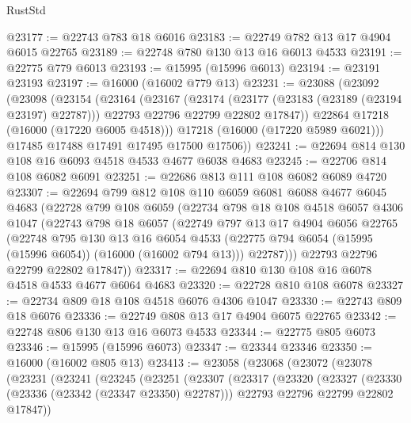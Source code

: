 \begin{lexlean}{RustStd}
\begin{coremodule}
@23177 := @22743 @783 @18 @6016
@23183 := @22749 @782 @13 @17 @4904 @6015 @22765
@23189 := @22748 @780 @130 @13 @16 @6013 @4533
@23191 := @22775 @779 @6013
@23193 := @15995 (@15996 @6013)
@23194 := @23191 @23193
@23197 := @16000 (@16002 @779 @13)
@23231 := @23088
    (@23092
      (@23098
        (@23154
          (@23164
            (@23167
              (@23174
                (@23177 (@23183 (@23189 (@23194 @23197) @22787)))
                @22793
                @22796
                @22799
                @22802
                @17847))
            @22864
            @17218
            (@16000 (@17220 @6005 @4518)))
          @17218
          (@16000 (@17220 @5989 @6021)))
        @17485
        @17488
        @17491
        @17495
        @17500
        @17506))
@23241 := @22694 @814 @130 @108 @16 @6093 @4518 @4533 @4677 @6038 @4683
@23245 := @22706 @814 @108 @6082 @6091
@23251 := @22686 @813 @111 @108 @6082 @6089 @4720
@23307 := @22694
    @799
    @812
    @108
    @110
    @6059
    @6081
    @6088
    @4677
    @6045
    @4683
    (@22728
      @799
      @108
      @6059
      (@22734
        @798
        @18
        @108
        @4518
        @6057
        @4306
        @1047
        (@22743
          @798
          @18
          @6057
          (@22749
            @797
            @13
            @17
            @4904
            @6056
            @22765
            (@22748
              @795
              @130
              @13
              @16
              @6054
              @4533
              (@22775 @794 @6054 (@15995 (@15996 @6054)) (@16000 (@16002 @794 @13)))
              @22787)))
        @22793
        @22796
        @22799
        @22802
        @17847))
@23317 := @22694 @810 @130 @108 @16 @6078 @4518 @4533 @4677 @6064 @4683
@23320 := @22728 @810 @108 @6078
@23327 := @22734 @809 @18 @108 @4518 @6076 @4306 @1047
@23330 := @22743 @809 @18 @6076
@23336 := @22749 @808 @13 @17 @4904 @6075 @22765
@23342 := @22748 @806 @130 @13 @16 @6073 @4533
@23344 := @22775 @805 @6073
@23346 := @15995 (@15996 @6073)
@23347 := @23344 @23346
@23350 := @16000 (@16002 @805 @13)
@23413 := @23058
    (@23068
      (@23072
        (@23078
          (@23231
            (@23241
              (@23245
                (@23251
                  (@23307
                    (@23317
                      (@23320
                        (@23327
                          (@23330 (@23336 (@23342 (@23347 @23350) @22787)))
                          @22793
                          @22796
                          @22799
                          @22802
                          @17847))

\end{coremodule}
\end{lexlean}
